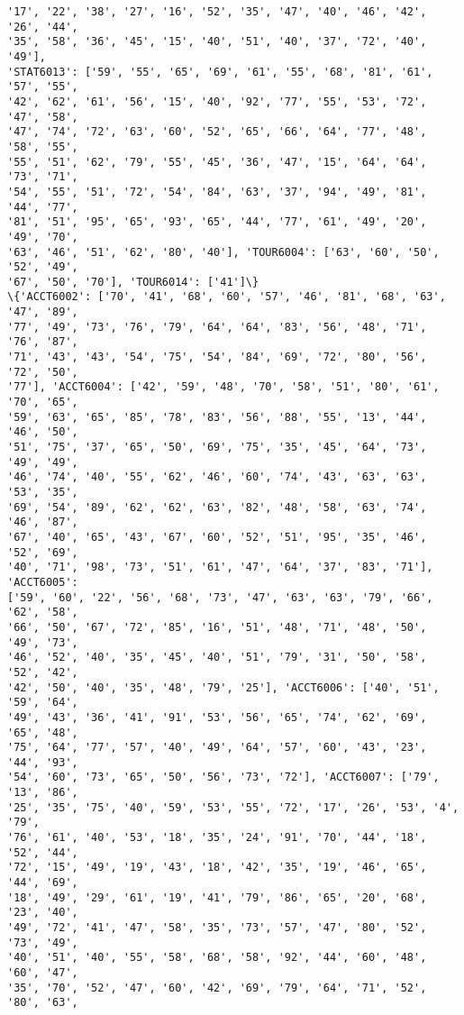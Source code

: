 \documentclass[11pt]{article}
\begin{document}
\begin{Verbatim}[commandchars=\\\{\}]
'17', '22', '38', '27', '16', '52', '35', '47', '40', '46', '42', '26', '44',
'35', '58', '36', '45', '15', '40', '51', '40', '37', '72', '40', '49'],
'STAT6013': ['59', '55', '65', '69', '61', '55', '68', '81', '61', '57', '55',
'42', '62', '61', '56', '15', '40', '92', '77', '55', '53', '72', '47', '58',
'47', '74', '72', '63', '60', '52', '65', '66', '64', '77', '48', '58', '55',
'55', '51', '62', '79', '55', '45', '36', '47', '15', '64', '64', '73', '71',
'54', '55', '51', '72', '54', '84', '63', '37', '94', '49', '81', '44', '77',
'81', '51', '95', '65', '93', '65', '44', '77', '61', '49', '20', '49', '70',
'63', '46', '51', '62', '80', '40'], 'TOUR6004': ['63', '60', '50', '52', '49',
'67', '50', '70'], 'TOUR6014': ['41']\}
\{'ACCT6002': ['70', '41', '68', '60', '57', '46', '81', '68', '63', '47', '89',
'77', '49', '73', '76', '79', '64', '64', '83', '56', '48', '71', '76', '87',
'71', '43', '43', '54', '75', '54', '84', '69', '72', '80', '56', '72', '50',
'77'], 'ACCT6004': ['42', '59', '48', '70', '58', '51', '80', '61', '70', '65',
'59', '63', '65', '85', '78', '83', '56', '88', '55', '13', '44', '46', '50',
'51', '75', '37', '65', '50', '69', '75', '35', '45', '64', '73', '49', '49',
'46', '74', '40', '55', '62', '46', '60', '74', '43', '63', '63', '53', '35',
'69', '54', '89', '62', '62', '63', '82', '48', '58', '63', '74', '46', '87',
'67', '40', '65', '43', '67', '60', '52', '51', '95', '35', '46', '52', '69',
'40', '71', '98', '73', '51', '61', '47', '64', '37', '83', '71'], 'ACCT6005':
['59', '60', '22', '56', '68', '73', '47', '63', '63', '79', '66', '62', '58',
'66', '50', '67', '72', '85', '16', '51', '48', '71', '48', '50', '49', '73',
'46', '52', '40', '35', '45', '40', '51', '79', '31', '50', '58', '52', '42',
'42', '50', '40', '35', '48', '79', '25'], 'ACCT6006': ['40', '51', '59', '64',
'49', '43', '36', '41', '91', '53', '56', '65', '74', '62', '69', '65', '48',
'75', '64', '77', '57', '40', '49', '64', '57', '60', '43', '23', '44', '93',
'54', '60', '73', '65', '50', '56', '73', '72'], 'ACCT6007': ['79', '13', '86',
'25', '35', '75', '40', '59', '53', '55', '72', '17', '26', '53', '4', '79',
'76', '61', '40', '53', '18', '35', '24', '91', '70', '44', '18', '52', '44',
'72', '15', '49', '19', '43', '18', '42', '35', '19', '46', '65', '44', '69',
'18', '49', '29', '61', '19', '41', '79', '86', '65', '20', '68', '23', '40',
'49', '72', '41', '47', '58', '35', '73', '57', '47', '80', '52', '73', '49',
'40', '51', '40', '55', '58', '68', '58', '92', '44', '60', '48', '60', '47',
'35', '70', '52', '47', '60', '42', '69', '79', '64', '71', '52', '80', '63',

\end{Verbatim}
\end{document}
